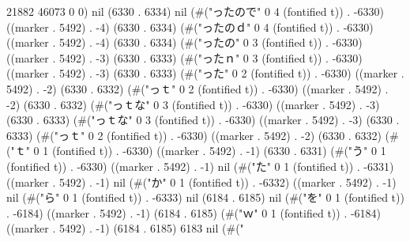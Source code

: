 21882 46073 0 0) nil (6330 . 6334) nil (#("ったので" 0 4 (fontified t)) . -6330) ((marker . 5492) . -4) (6330 . 6334) (#("ったのｄ" 0 4 (fontified t)) . -6330) ((marker . 5492) . -4) (6330 . 6334) (#("ったの" 0 3 (fontified t)) . -6330) ((marker . 5492) . -3) (6330 . 6333) (#("ったｎ" 0 3 (fontified t)) . -6330) ((marker . 5492) . -3) (6330 . 6333) (#("った" 0 2 (fontified t)) . -6330) ((marker . 5492) . -2) (6330 . 6332) (#("っｔ" 0 2 (fontified t)) . -6330) ((marker . 5492) . -2) (6330 . 6332) (#("っｔな" 0 3 (fontified t)) . -6330) ((marker . 5492) . -3) (6330 . 6333) (#("っｔな" 0 3 (fontified t)) . -6330) ((marker . 5492) . -3) (6330 . 6333) (#("っｔ" 0 2 (fontified t)) . -6330) ((marker . 5492) . -2) (6330 . 6332) (#("ｔ" 0 1 (fontified t)) . -6330) ((marker . 5492) . -1) (6330 . 6331) (#("う" 0 1 (fontified t)) . -6330) ((marker . 5492) . -1) nil (#("た" 0 1 (fontified t)) . -6331) ((marker . 5492) . -1) nil (#("か" 0 1 (fontified t)) . -6332) ((marker . 5492) . -1) nil (#("ら" 0 1 (fontified t)) . -6333) nil (6184 . 6185) nil (#("を" 0 1 (fontified t)) . -6184) ((marker . 5492) . -1) (6184 . 6185) (#("ｗ" 0 1 (fontified t)) . -6184) ((marker . 5492) . -1) (6184 . 6185) 6183 nil (#("
